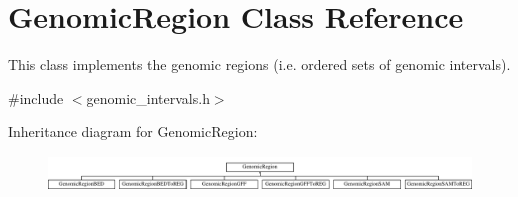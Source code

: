 \hypertarget{classGenomicRegion}{
\section{GenomicRegion Class Reference}
\label{classGenomicRegion}
}


This class implements the genomic regions (i.e. ordered sets of genomic intervals).  




{\ttfamily \#include $<$genomic\_\-intervals.h$>$}

Inheritance diagram for GenomicRegion:\begin{figure}[H]
\begin{center}
\leavevmode
\includegraphics[height=0.914286cm]{classGenomicRegion}
\end{center}
\end{figure}
